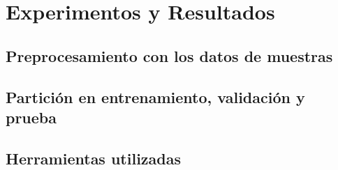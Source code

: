 \section{Experimentos y Resultados}

\subsection{Preprocesamiento con los datos de muestras}

\subsection{Partición en entrenamiento, validación y prueba}



\subsection{Herramientas utilizadas}
